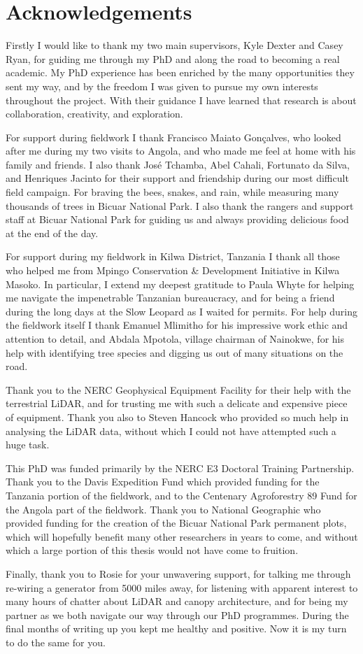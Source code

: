 \chapter*{Acknowledgements}
\label{acknowledgements}

Firstly I would like to thank my two main supervisors, Kyle Dexter and Casey Ryan, for guiding me through my PhD and along the road to becoming a real academic. My PhD experience has been enriched by the many opportunities they sent my way, and by the freedom I was given to pursue my own interests throughout the project. With their guidance I have learned that research is about collaboration, creativity, and exploration. 

For support during fieldwork I thank Francisco Maiato Gon\c{c}alves, who looked after me during my two visits to Angola, and who made me feel at home with his family and friends. I also thank Jos\'{e} Tchamba, Abel Cahali, Fortunato da Silva, and Henriques Jacinto for their support and friendship during our most difficult field campaign. For braving the bees, snakes, and rain, while measuring many thousands of trees in Bicuar National Park. I also thank the rangers and support staff at Bicuar National Park for guiding us and always providing delicious food at the end of the day. 

For support during my fieldwork in Kilwa District, Tanzania I thank all those who helped me from Mpingo Conservation \& Development Initiative in Kilwa Masoko. In particular, I extend my deepest gratitude to Paula Whyte for helping me navigate the impenetrable Tanzanian bureaucracy, and for being a friend during the long days at the Slow Leopard as I waited for permits. For help during the fieldwork itself I thank Emanuel Mlimitho for his impressive work ethic and attention to detail, and Abdala Mpotola, village chairman of Nainokwe, for his help with identifying tree species and digging us out of many situations on the road.

Thank you to the NERC Geophysical Equipment Facility for their help with the terrestrial LiDAR, and for trusting me with such a delicate and expensive piece of equipment. Thank you also to Steven Hancock who provided so much help in analysing the LiDAR data, without which I could not have attempted such a huge task.

This PhD was funded primarily by the NERC E3 Doctoral Training Partnership. Thank you to the Davis Expedition Fund which provided funding for the Tanzania portion of the fieldwork, and to the Centenary Agroforestry 89 Fund for the Angola part of the fieldwork. Thank you to National Geographic who provided funding for the creation of the Bicuar National Park permanent plots, which will hopefully benefit many other researchers in years to come, and without which a large portion of this thesis would not have come to fruition.

Finally, thank you to Rosie for your unwavering support, for talking me through re-wiring a generator from 5000 miles away, for listening with apparent interest to many hours of chatter about LiDAR and canopy architecture, and for being my partner as we both navigate our way through our PhD programmes. During the final months of writing up you kept me healthy and positive. Now it is my turn to do the same for you.
